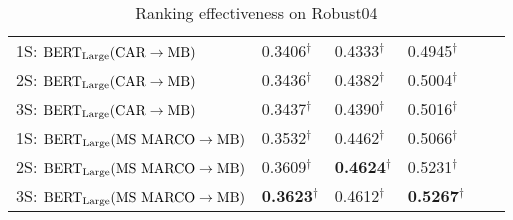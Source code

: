 \begin{table*}[t!]
{\begin{tabular}{lll lll}
\midrule
1S: $ \textrm{BERT}_{\textrm{\scriptsize Large}}(\textrm{CAR}\rightarrow\textrm{MB}) $ & 0.3406$^{\dagger}$ & 0.4333$^{\dagger}$ & 0.4945$^{\dagger}$ \\
2S: $ \textrm{BERT}_{\textrm{\scriptsize Large}}(\textrm{CAR}\rightarrow\textrm{MB}) $ & 0.3436$^{\dagger}$ & 0.4382$^{\dagger}$ & 0.5004$^{\dagger}$ \\
3S: $ \textrm{BERT}_{\textrm{\scriptsize Large}}(\textrm{CAR}\rightarrow\textrm{MB}) $ & 0.3437$^{\dagger}$ & 0.4390$^{\dagger}$ & 0.5016$^{\dagger}$ \\
\midrule
1S: $ \textrm{BERT}_{\textrm{\scriptsize Large}}(\textrm{MS MARCO}\rightarrow\textrm{MB}) $ & 0.3532$^{\dagger}$ & 0.4462$^{\dagger}$ & 0.5066$^{\dagger}$ \\
2S: $ \textrm{BERT}_{\textrm{\scriptsize Large}}(\textrm{MS MARCO}\rightarrow\textrm{MB}) $ & 0.3609$^{\dagger}$ & \textbf{0.4624}$^{\dagger}$ & 0.5231$^{\dagger}$ \\
3S: $ \textrm{BERT}_{\textrm{\scriptsize Large}}(\textrm{MS MARCO}\rightarrow\textrm{MB}) $ & \textbf{0.3623}$^{\dagger}$ & 0.4612$^{\dagger}$ & \textbf{0.5267}$^{\dagger}$ \\
\bottomrule
\end{tabular}
}
\caption{Ranking effectiveness on Robust04}
\label{tab:results-robust04}
\end{table*}

